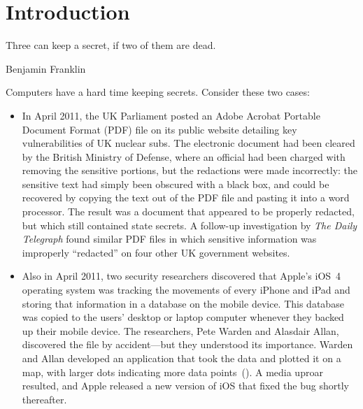 \chapter{Introduction}
\epigraph{Three can keep a secret, if two of them are dead.}{Benjamin
  Franklin}

Computers have a hard time keeping secrets.  Consider these two cases:

\begin{itemize}
\item In April 2011, the UK Parliament posted an Adobe Acrobat Portable
Document Format (PDF) file on its public website detailing key
vulnerabilities of UK nuclear subs. The electronic document had been
cleared by the British Ministry of Defense, where an official had been
charged with removing the sensitive portions, but the redactions were
made incorrectly: the sensitive text had simply been obscured with a
black box, and could be recovered by copying the text out of the PDF
file and pasting it into a word processor. The result was a document
that appeared to be properly redacted, but which still contained state
secrets.  A follow-up investigation by \emph{The Daily Telegraph}
found similar PDF files in which sensitive information was improperly
``redacted'' on four other UK government
websites\cite{telegraph-april2011-secrets}.

\item Also in April 2011, two security researchers discovered that
Apple's iOS~4 operating system was tracking the movements of every
iPhone and iPad and storing that information in a database on the
mobile device. This database was copied to the users'
desktop or laptop computer whenever they backed up their mobile
device. The researchers, Pete Warden and Alasdair Allan, discovered
the file by accident---but they understood its
importance\cite{apple-tracking}. Warden and Allan developed an application that
took the data and plotted it on a map, with larger dots indicating
more data points~(). A media uproar resulted, and
Apple released a new version of iOS that fixed the bug shortly
thereafter\cite{apple-tracking-statement}. 

\end{itemize}


